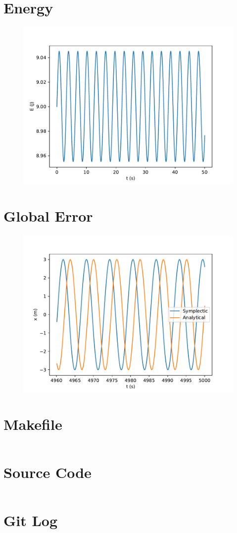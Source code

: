 \documentclass{article}
\begin{document}
\section{Energy}
    \begin{figure}[h!]
        \centering
        \includegraphics[scale=0.6]{energy.pdf}
        \label{energy}
    \end{figure}
    
    

\section{Global Error}
    \begin{figure}[h!]
        \centering
        \includegraphics[scale=0.6]{error.pdf}	
        \label{error}
    \end{figure}
        
    

\break
\section{Makefile}
	\inputminted{make}{Makefile}

\section{Source Code}
	\inputminted{python}{phase.py}

\section{Git Log}
    
\end{document}
